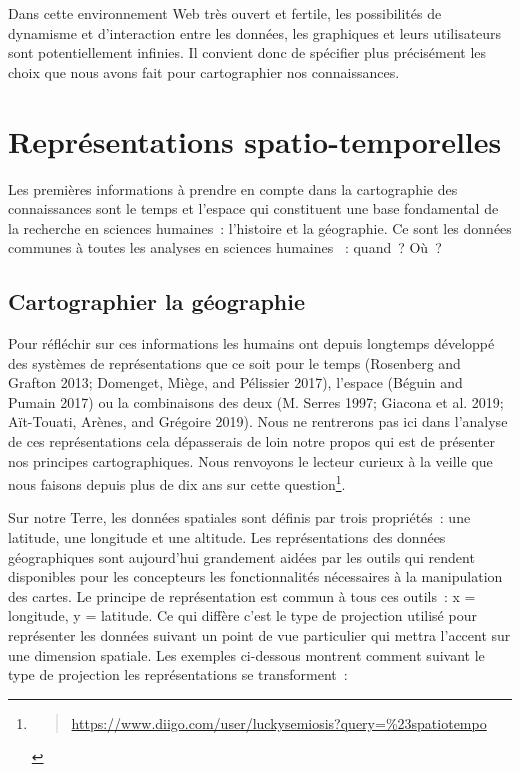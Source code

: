 \documentclass[
  letterpaper,
  DIV=11,
  numbers=noendperiod]{scrreprt}
\begin{document}
Dans cette environnement Web très ouvert et fertile, les possibilités de
dynamisme et d'interaction entre les données, les graphiques et leurs
utilisateurs sont potentiellement infinies. Il convient donc de
spécifier plus précisément les choix que nous avons fait pour
cartographier nos connaissances.

\hypertarget{sec-repSpatioTempo}{%
\section{Représentations spatio-temporelles}\label{sec-repSpatioTempo}}

Les premières informations à prendre en compte dans la cartographie des
connaissances sont le temps et l'espace qui constituent une base
fondamental de la recherche en sciences humaines~: l'histoire et la
géographie. Ce sont les données communes à toutes les analyses en
sciences humaines ~: quand~? Où~?

\hypertarget{sec-cartoGeo}{%
\subsection{Cartographier la géographie}\label{sec-cartoGeo}}

Pour réfléchir sur ces informations les humains ont depuis longtemps
développé des systèmes de représentations que ce soit pour le temps
(Rosenberg and Grafton 2013; Domenget, Miège, and Pélissier 2017),
l'espace (Béguin and Pumain 2017) ou la combinaisons des deux (M. Serres
1997; Giacona et al. 2019; Aït-Touati, Arènes, and Grégoire 2019). Nous
ne rentrerons pas ici dans l'analyse de ces représentations cela
dépasserais de loin notre propos qui est de présenter nos principes
cartographiques. Nous renvoyons le lecteur curieux à la veille que nous
faisons depuis plus de dix ans sur cette question\footnote{\begin{quote}
  \url{https://www.diigo.com/user/luckysemiosis?query=\%23spatiotempo}
  \end{quote}}.

Sur notre Terre, les données spatiales sont définis par trois
propriétés~: une latitude, une longitude et une altitude. Les
représentations des données géographiques sont aujourd'hui grandement
aidées par les outils qui rendent disponibles pour les concepteurs les
fonctionnalités nécessaires à la manipulation des cartes. Le principe de
représentation est commun à tous ces outils~: x = longitude, y =
latitude. Ce qui diffère c'est le type de projection utilisé pour
représenter les données suivant un point de vue particulier qui mettra
l'accent sur une dimension spatiale. Les exemples ci-dessous montrent
comment suivant le type de projection les représentations se
transforment~:
\end{document}
